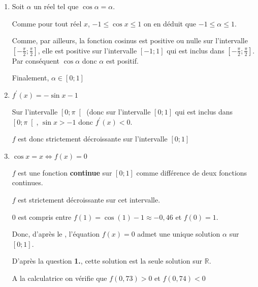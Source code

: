 \begin{corrige}
     \begin{enumerate}
          \item
          Soit $\alpha $ un réel tel que $\cos \alpha  = \alpha $.
          \par
          Comme pour tout réel $x$, $-1 \leqslant  \cos x \leqslant  1$ on en déduit que $-1 \leqslant  \alpha  \leqslant  1$.
          \par
          Comme, par ailleurs, la fonction cosinus est positive ou nulle sur l'intervalle $\left[-\frac{\pi }{2} ; \frac{\pi }{2}\right]$, elle est positive sur l'intervalle  $\left[-1 ; 1\right]$ qui est inclus dans $\left[-\frac{\pi }{2} ; \frac{\pi }{2}\right]$. Par conséquent $\cos \alpha $ donc $\alpha $ est positif.
          \par
          Finalement, $\alpha  \in  \left[0 ; 1\right]$
          \item
          $f^{\prime}\left(x\right) = -\sin x-1$
          \par
          Sur l'intervalle $\left[0; \pi \right[$ (donc sur l'intervalle $\left[0 ; 1\right]$ qui est inclus dans $\left[0; \pi\right[$, $\sin x > -1$ donc $f^{\prime}\left(x\right) < 0$.
          \par
          $f$ est donc strictement décroissante sur l'intervalle $\left[0 ; 1\right]$
          \item
          $\cos x = x  \Leftrightarrow   f\left(x\right) = 0$
          \par
          $f$ est une fonction \textbf{ continue} sur $\left[0 ; 1\right]$ comme différence de deux fonctions continues.
          \par
          $f$ est strictement décroissante sur cet intervalle.
          \par
          $0$ est compris entre $f\left(1\right)=\cos\left(1\right)-1\approx -0,46$ et $f\left(0\right)=1$.
          \par
          Donc, d'après le , l'équation $f\left(x\right)=0$ admet une unique solution $\alpha $ sur  $\left[0; 1\right]$.
          \par
          D'après la question \textbf{1.}, cette solution est la seule solution sur $\mathbb{R}$.
          \par
          A la calculatrice on vérifie que $f\left(0,73\right) > 0$ et $f\left(0,74\right) < 0$
          \par

\end{enumerate}
\end{corrige}
